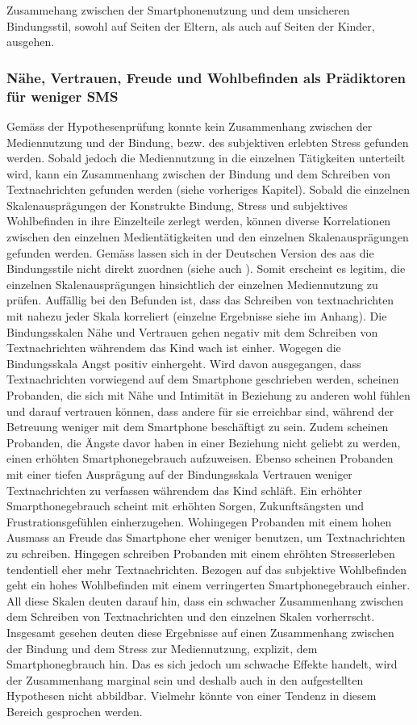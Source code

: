 Zusammehang zwischen der Smartphonenutzung und dem unsicheren Bindungsstil, sowohl auf Seiten der Eltern, als auch auf Seiten der Kinder, ausgehen.

\subsubsection{Nähe, Vertrauen, Freude und Wohlbefinden als Prädiktoren für weniger SMS}
Gemäss der Hypothesenprüfung konnte kein Zusammenhang zwischen der Mediennutzung und der Bindung, bezw. des subjektiven erlebten Stress gefunden werden. Sobald jedoch die Mediennutzung in die einzelnen Tätigkeiten unterteilt wird, kann ein Zusammenhang zwischen der Bindung und dem Schreiben von Textnachrichten gefunden werden (siehe vorheriges Kapitel). Sobald die einzelnen Skalenausprägungen der Konstrukte Bindung, Stress und subjektives Wohlbefinden in ihre Einzelteile zerlegt werden, können diverse Korrelationen zwischen den einzelnen Medientätigkeiten und den einzelnen Skalenausprägungen gefunden werden. Gemäss  lassen sich in der Deutschen Version des \acrshort{aas} die Bindungsstile nicht direkt zuordnen (siehe auch \textit{}). Somit erscheint es legitim, die einzelnen Skalenausprägungen hinsichtlich der einzelnen Mediennutzung zu prüfen. Auffällig bei den Befunden ist, dass das Schreiben von textnachrichten mit nahezu jeder Skala korreliert (einzelne Ergebnisse siehe  im Anhang). Die Bindungsskalen Nähe und Vertrauen gehen negativ mit dem Schreiben von Textnachrichten währendem das Kind wach ist einher. Wogegen die Bindungsskala Angst positiv einhergeht. Wird davon ausgegangen, dass Textnachrichten vorwiegend auf dem Smartphone geschrieben werden, scheinen Probanden, die sich mit Nähe und Intimität in Beziehung zu anderen wohl fühlen und darauf vertrauen können, dass andere für sie erreichbar sind, während der Betreuung weniger mit dem Smartphone beschäftigt zu sein. Zudem scheinen Probanden, die Ängste davor haben in einer Beziehung nicht geliebt zu werden, einen erhöhten Smartphonegebrauch aufzuweisen. Ebenso scheinen Probanden mit einer tiefen Ausprägung auf der Bindungsskala Vertrauen weniger Textnachrichten zu verfassen währendem das Kind schläft. Ein erhöhter Smarpthonegebrauch scheint mit erhöhten Sorgen, Zukunftsängsten und Frustrationsgefühlen einherzugehen. Wohingegen Probanden mit einem hohen Ausmass an Freude das Smartphone eher weniger benutzen, um Textnachrichten zu schreiben. Hingegen schreiben Probanden mit einem ehröhten Stresserleben tendentiell eher mehr Textnachrichten. Bezogen auf das subjektive Wohlbefinden geht ein hohes Wohlbefinden mit einem verringerten Smartphonegebrauch einher. All diese Skalen deuten darauf hin, dass ein schwacher Zusammenhang zwischen dem Schreiben von Textnachrichten und den einzelnen Skalen vorherrscht. Insgesamt gesehen deuten diese Ergebnisse auf einen Zusammenhang zwischen der Bindung und dem Stress zur Mediennutzung, explizit, dem Smartphonegbrauch hin. Das es sich jedoch um schwache Effekte handelt, wird der Zusammenhang marginal sein und deshalb auch in den aufgestellten Hypothesen nicht abbildbar. Vielmehr könnte von einer Tendenz in diesem Bereich gesprochen werden. 